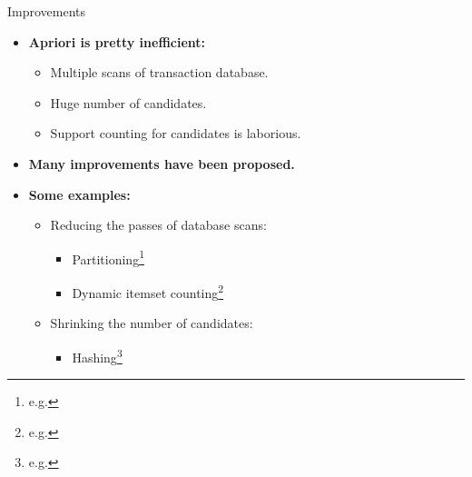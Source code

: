 \begin{frame}{Improvements}
	\begin{itemize}
		\item \textbf{Apriori is pretty inefficient:}
		      \begin{itemize}
			      \item Multiple scans of transaction database.
			      \item Huge number of candidates.
			      \item Support counting for candidates is laborious.
		      \end{itemize}
		\item \textbf{Many improvements have been proposed.}
		\item \textbf{Some examples:}
		      \begin{itemize}
			      \item Reducing the passes of database scans:
			            \begin{itemize}
				            \item Partitioning\footnote{e.g. }
				            \item Dynamic itemset counting\footnote{e.g. }
			            \end{itemize}
			      \item Shrinking the number of candidates:
			            \begin{itemize}
				            \item Hashing\footnote{e.g. }
			            \end{itemize}
		      \end{itemize}
	\end{itemize}
\end{frame}

